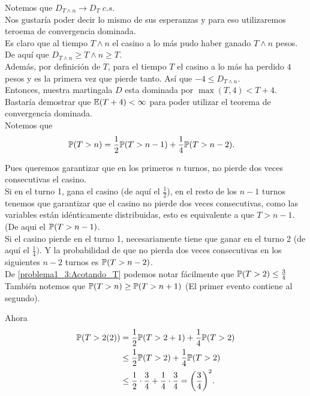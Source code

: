 	Notemos que $D_{T \wedge n} \longrightarrow D_T \; c.s.$\\
	
	Nos gustaría poder decir lo mismo de sus esperanzas y para eso utilizaremos teroema de convergencia dominada.\\
	
	Es claro que al tiempo $T \wedge n$ el casino a lo más pudo haber ganado $T \wedge n$ pesos.
	De aquí que $D_{T \wedge n} \geq T \wedge n \geq T$.\\
	
	Además, por definición de $T$, para el tiempo $T$ el casino a lo más ha perdido $4$ pesos y es la primera vez que 
	pierde tanto. Así que $-4 \leq D_{T \wedge n}$.\\ 
	
	Entonces, nuestra martingala $D$ esta dominada por $\max(T, 4) < T + 4$. Bastaría demostrar que $\mathbb{E}(T+4) < \infty$ para poder
	utilizar el teorema de convergencia dominada.\\
	
	Notemos que 
	\begin{align}\label{problema1_3:Acotando_T}
		\mathbb{P}(T > n) &= \frac{1}{2} \mathbb{P}(T > n-1) + \frac{1}{4} \mathbb{P}(T > n-2). 
	\end{align}
	
	Pues queremos garantizar que en los primeros $n$ turnos, no pierde dos veces consecutivas el casino.\\
	
	Si en el turno 1, gana el casino (de aquí el $\frac{1}{2}$), en el resto de los $n-1$ turnos tenemos que garantizar que 
	el casino no pierde dos veces consecutivas, como las variables están idénticamente distribuidas, esto es equivalente a que
	$T>n-1$. (De aqui el $\mathbb{P}(T > n-1)$.\\
	
	Si el casino pierde en el turno 1, necesariamente tiene que ganar en el turno 2 (de aquí el $\frac{1}{4})$. Y la probabilidad
	de que no pierda dos veces consecutivas en los siguientes $n-2$ turnos es $\mathbb{P}(T > n-2)$.\\					    
	
	De \eqref{problema1_3:Acotando_T} podemos notar fácilmente que $\mathbb{P}(T > 2) \leq \frac{3}{4}$\\
	
	También notemos que $\mathbb{P}(T > n ) \geq \mathbb{P}(T > n + 1)$ (El primer evento contiene al segundo).
	
	Ahora
	\begin{align}
		\mathbb{P}(T > 2 (2)) &=     \frac{1}{2} \mathbb{P}(T > 2+1) + \frac{1}{4} \mathbb{P}(T > 2) \\
					   &\leq  \frac{1}{2} \mathbb{P}(T > 2) + \frac{1}{4} \mathbb{P}(T > 2) \\
					   &\leq  \frac{1}{2} \cdot \frac{3}{4} + \frac{1}{4} \cdot \frac{3}{4} = \bigg(\frac{3}{4}\bigg)^2.
	\end{align}
	
